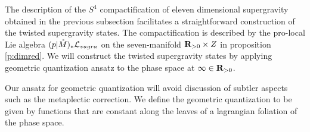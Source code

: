 %
%
%
%
%
\parsec[s:hilbertspace]
The description of the $S^{4}$ compactification of eleven dimensional supergravity obtained in the previous subsection facilitates a straightforward construction of the twisted supergravity states. 
The compactification is described by the pro-local Lie algebra $(p|\mathring M)_{*} \mathcal L_{sugra}$ on the seven-manifold $\mathbf{R}_{>0}\times Z$ in proposition \ref{p:dimred}. We will construct the twisted supergravity states by applying geometric quantization ansatz to the phase space at $\infty \in \mathbf{R}_{>0}$.

Our ansatz for geometric quantization will avoid discussion of subtler aspects such as the metaplectic correction. We define the geometric quantization to be given by functions that are constant along the leaves of a lagrangian foliation of the phase space.

